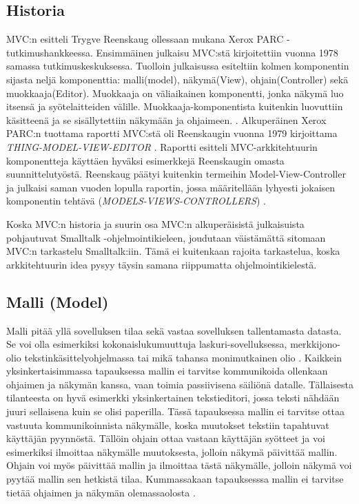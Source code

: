 \documentclass[finnish,utf8,nonumbib,palatino,kandi]{gradu2}
\begin{document}
\subsection{Historia}

MVC:n esitteli Trygve Reenskaug ollessaan mukana Xerox PARC -tutkimushankkeessa. Ensimmäinen julkaisu MVC:stä
kirjoitettiin vuonna 1978 samassa tutkimuskeskuksessa. Tuolloin julkaisussa esiteltiin kolmen komponentin sijasta neljä
komponenttia: malli(model), näkymä(View), ohjain(Controller) sekä muokkaaja(Editor). Muokkaaja on väliaikainen komponentti, jonka näkymä
luo itsensä ja syötelaitteiden välille. Muokkaaja-komponentista kuitenkin luovuttiin käsitteenä ja se sisällytettiin näkymään ja ohjaimeen. \cite{Reenskaug}.
Alkuperäinen Xerox PARC:n tuottama raportti MVC:stä oli Reenskaugin vuonna 1979 kirjoittama \emph{THING-MODEL-VIEW-EDITOR} \cite{Reenskaug:1979}. Raportti
esitteli MVC-arkkitehtuurin komponentteja käyttäen hyväksi esimerkkejä Reenskaugin omasta suunnittelutyöstä. Reenskaug päätyi kuitenkin termeihin Model-View-Controller ja julkaisi saman
vuoden lopulla raportin, jossa määritellään lyhyesti jokaisen komponentin tehtävä (\emph{MODELS-VIEWS-CONTROLLERS}) \cite{Reenskaug:2007}.

Koska MVC:n historia ja suurin osa MVC:n
alkuperäisistä julkaisuista pohjautuvat Smalltalk -ohjelmointikieleen, joudutaan väistämättä sitomaan MVC:n tarkastelu Smalltalk:iin. Tämä ei kuitenkaan rajoita tarkastelua, koska arkkitehtuurin idea pysyy täysin samana riippumatta ohjelmointikielestä. 

\subsection{Malli (Model)}
Malli pitää yllä sovelluksen tilaa sekä vastaa sovelluksen tallentamasta datasta. Se voi olla esimerkiksi kokonaislukumuuttuja laskuri-sovelluksessa, merkkijono-olio tekstinkäsittelyohjelmassa tai
mikä tahansa monimutkainen olio \cite[s. 3]{Krasner:desc}. Kaikkein yksinkertaisimmassa tapauksessa mallin ei tarvitse kommunikoida ollenkaan ohjaimen ja näkymän kanssa, vaan toimia passiivisena säiliönä datalle.
Tällaisesta tilanteesta on hyvä esimerkki yksinkertainen tekstieditori, jossa teksti nähdään juuri sellaisena kuin se olisi paperilla. Tässä tapauksessa mallin ei tarvitse ottaa vastuuta
kommunikoinnista näkymälle, koska muutokset tekstiin tapahtuvat käyttäjän pyynnöstä. Tällöin ohjain ottaa vastaan käyttäjän syötteet ja voi esimerkiksi ilmoittaa näkymälle muutoksesta, jolloin näkymä
päivittää mallin. Ohjain voi myös päivittää mallin ja ilmoittaa tästä näkymälle, jolloin näkymä voi pyytää mallin sen hetkistä tilaa. Kummassakaan tapauksesssa mallin ei tarvitse tietää ohjaimen ja näkymän
olemassaolosta \cite{Burbeck}.
\end{document}
